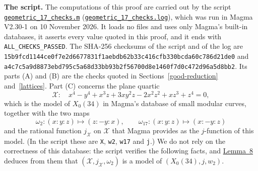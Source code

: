 \documentclass[11pt]{article}
\begin{document}
\medskip
\textbf{The script.} The computations of this proof are carried out by the script
\href{https://genus-2-torsion.github.io/data/knowledge/sources/geometric_17_checks.m}{\texttt{geometric\_\allowbreak{}17\_\allowbreak{}checks.m}}
(\href{https://genus-2-torsion.github.io/data/knowledge/sources/geometric_17_checks.log}{\texttt{geometric\_\allowbreak{}17\_\allowbreak{}checks.log}}),
which was run in Magma V2.30-1 \cite{Magma} on 10 November 2026. It loads no files and uses only
Magma's built-in databases, it asserts every value quoted in this proof, and it ends with
\texttt{ALL\_CHECKS\_PASSED}. The SHA-256 checksums of the script and of the log are
\texttt{15b9fcd1144ce0f7\allowbreak e2d6677831f1aebd\allowbreak b62b33c416cfb330\allowbreak bcda60c786d21de0}
and
\texttt{a4c7c5a9d8873ebd\allowbreak 795c5a68d33bb93b\allowbreak 2f56700d8e1460f7\allowbreak d0c472d96a5d8bb2}. Its parts (A) and (B) are
the checks quoted in Sections~\ref{good-reduction} and~\ref{lattices}. Part (C) concerns the
plane quartic
\[\mathcal X:\quad x^4-y^4+x^3z+3xy^2z-2x^2z^2+xz^3+z^4=0,\]
which is the model of \(X_0(34)\) in Magma's database of small modular curves, together with the
two maps
\[\omega_2:(x:y:z)\mapsto(z:-y:x),\qquad\omega_{17}:(x:y:z)\mapsto(x:-y:z)\]
and the rational function \(j_{\mathcal X}\) on \(\mathcal X\) that Magma provides as the
\(j\)-function of this model. (In the script these are \texttt{X}, \texttt{w2}, \texttt{w17} and
\texttt{j}.) We do not rely on the correctness of this database: the script verifies the
following facts, and \hyperref[lemma-model]{Lemma~8} deduces from them that
\((\mathcal X,j_{\mathcal X},\omega_2)\) is a model of \((X_0(34),j,w_2)\).
\end{document}
